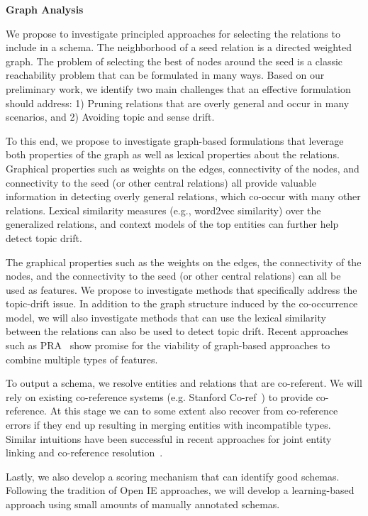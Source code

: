 \textbf{Graph Analysis} 

We propose to investigate principled approaches for selecting the relations to include in a schema. 
The neighborhood of a seed relation is a directed weighted graph. The problem of selecting the best of nodes around the seed is a classic reachability problem that can be formulated in many ways.  Based on our preliminary work, we identify two main challenges that an effective formulation should address: 1) Pruning relations that are overly general and occur in many scenarios, and 2) Avoiding topic and sense drift.   

To this end, we propose to investigate graph-based formulations that leverage both properties of the graph as well as lexical properties about the relations. Graphical properties such as weights on the edges, connectivity of the nodes, and connectivity to the seed (or other central relations) all provide valuable information in detecting overly general relations, which co-occur with many other relations. 
Lexical similarity measures (e.g., word2vec similarity) over the generalized relations, and context models of the top entities can further help detect topic drift.  

The graphical properties such as the weights on the edges, the connectivity of the nodes, and the connectivity to the seed (or other central relations) can all be used as features.
We propose to investigate methods that specifically address the topic-drift issue. In addition to the graph structure induced by the co-occurrence model, we will also investigate methods that can use the lexical similarity between the relations can also be used to detect topic drift. Recent approaches such as PRA~\cite{} show promise for the viability of graph-based approaches to combine multiple types of features. 

To output a schema, we resolve entities and relations that are co-referent. We will rely on existing co-reference systems (e.g. Stanford Co-ref~\cite{}) to provide co-reference. At this stage we can to some extent also recover from co-reference errors if they end up resulting in merging entities with incompatible types. Similar intuitions have been successful in recent approaches for joint entity linking and co-reference resolution~\cite{}. 

Lastly, we also develop a scoring mechanism that can identify good schemas. Following the tradition of Open IE approaches, we will develop a learning-based approach using small amounts of manually annotated schemas. 

